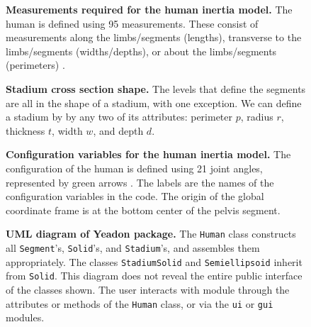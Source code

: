 \documentclass[10pt]{article}
\begin{document}
\begin{figure}[!ht]
\begin{center}
\end{center}
\caption{
{\bf Measurements required for the human inertia model.}  The human is defined
using 95 measurements. These consist of measurements along the limbs/segments
(lengths), transverse to the limbs/segments (widths/depths), or about the
limbs/segments (perimeters) \cite{Yeadon1990c}.
}
\label{fig:meas}
\end{figure}

\begin{figure}[!ht]
\begin{center}
\end{center}
\caption{
{\bf Stadium cross section shape.}  The levels that define the segments are all
in the shape of a stadium, with one exception. We can define a stadium by
by any two of its attributes: perimeter $p$, radius $r$, thickness $t$,  width
$w$, and depth $d$.
}
\label{fig:stadium}
\end{figure}

\begin{figure}[!ht]
\begin{center}
\end{center}
\caption{
{\bf Configuration variables for the human inertia model.}  The configuration of
the human is defined using 21 joint angles, represented by green arrows
\cite{Yeadon1990e}. The labels are the names of the configuration variables in
the code. The origin of the global coordinate frame is at the bottom center of
the pelvis segment.
}
\label{fig:config}
\end{figure}

\begin{figure}[!ht]
\begin{center}
\end{center}
\caption{
{\bf UML diagram of Yeadon package.}  The \verb+Human+ class constructs all
\verb+Segment+'s, \verb+Solid+'s, and \verb+Stadium+'s, and assembles them
appropriately. The classes \verb+StadiumSolid+ and \verb+Semiellipsoid+ inherit
from \verb+Solid+. This diagram does not reveal the entire public interface of
the classes shown. The user interacts with module through the attributes or
methods of the \verb+Human+ class, or via the \verb+ui+ or \verb+gui+ modules.
}
\label{Figure_label}
\end{figure}
\end{document}
